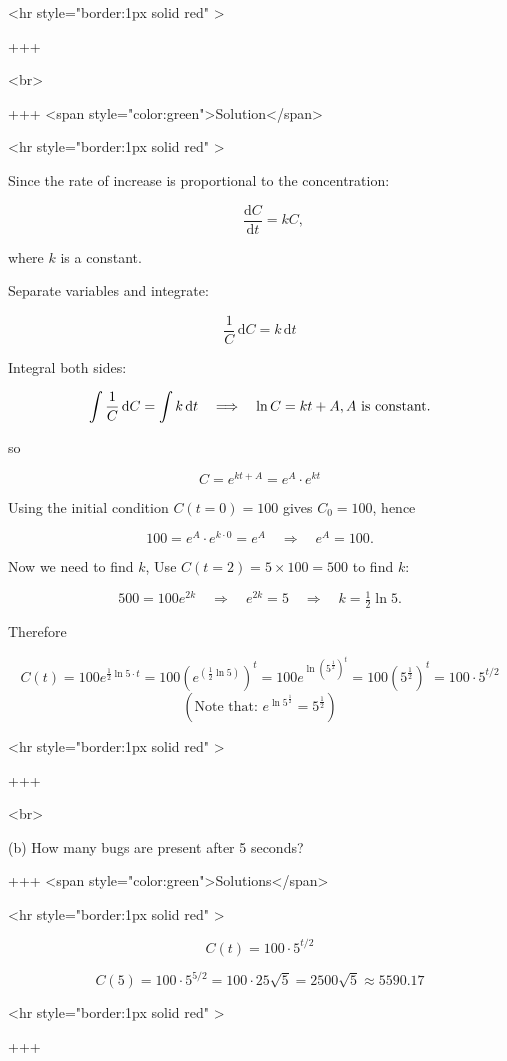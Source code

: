 <hr style="border:1px solid red" >

+++

<br>

+++ <span style="color:green">Solution</span>

<hr style="border:1px solid red" >

Since the rate of increase is proportional to the concentration:

$$
\qquad \frac{\mathrm{d}C}{\mathrm{d}t}=kC,
$$

where $k$ is a constant.

Separate variables and integrate:

$$\frac{1}{C}\,\mathrm{d}C = k\,\mathrm{d}t$$

Integral both sides:

$$
\int \frac{1}{C}\,\mathrm{d}C = \int k\,\mathrm{d}t
\quad\Longrightarrow\quad
\ln C = kt + A, \space A\text{ is constant.}
$$

so

$$
C = e^{kt+A} = e^A \cdot e^{kt}
$$

Using the initial condition $C(t=0)=100$ gives $C_0=100$, hence

$$
100=e^A\cdot e^{k \cdot 0} = e^A \quad\Rightarrow\quad e^A=100.
$$

Now we need to find $k$, Use $C(t=2)=5\times 100=500$ to find $k$:

$$
500 = 100e^{2k}\quad\Rightarrow\quad e^{2k}=5
\quad\Rightarrow\quad k=\tfrac{1}{2}\ln 5.
$$


Therefore

$$
C(t)=100e^{\frac{1}{2}\ln 5 \cdot t} = 100(e^{(\frac{1}{2}\ln 5)})^{t} = 100 e^{\ln(5^\frac{1}{2})^{t}} = 100 (5^\frac{1}{2})^t=  100\cdot 5^{t/2}
$$
$$
( \text{Note that: } e^{\ln{5^\frac{1}{2}}} = 5^\frac{1}{2} )
$$

<hr style="border:1px solid red" >

+++

<br>

(b) How many bugs are present after 5 seconds?

+++ <span style="color:green">Solutions</span>

<hr style="border:1px solid red" >

$$
C(t)=100\cdot 5^{t/2}
$$

$$
C(5)=100\cdot 5^{5/2}=100\cdot 25\sqrt{5}=2500\sqrt{5}\approx 5590.17
$$

<hr style="border:1px solid red" >

+++

